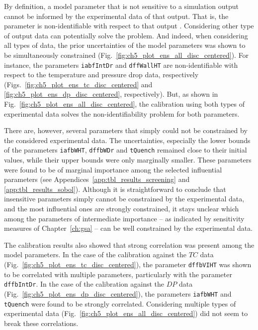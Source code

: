 By definition, a model parameter that is not sensitive to a simulation output cannot be informed by the experimental data of that output. 
That is, the parameter is non-identifiable with respect to that output \cite{Hines2014}.
Considering other type of output data can potentially solve the problem.
And indeed, when considering all types of data, the prior uncertainties of the model parameters was shown to be simultaneously constrained (Fig.~\ref{fig:ch5_plot_ens_all_disc_centered}).
For instance, the parameters \texttt{iabfIntDr} and \texttt{dffWallHT} are non-identifiable with respect to the temperature and pressure drop data, respectively (Figs.~\ref{fig:ch5_plot_ens_tc_disc_centered} and \ref{fig:ch5_plot_ens_dp_disc_centered}, respectively).
But, as shown in Fig.~\ref{fig:ch5_plot_ens_all_disc_centered}, the calibration using both types of experimental data solves the non-identifiability problem for both parameters.

There are, however, several parameters that simply could not be constrained by the considered experimental data.
The uncertainties, especially the lower bounds of the parameters \texttt{iafbWHT}, \texttt{dffbWDr} and \texttt{tQuench} remained close to their initial values,
while their upper bounds were only marginally smaller.
These parameters were found to be of marginal importance among the selected influential parameters (see Appendices~\ref{app:tbl_results_screening} and \ref{app:tbl_results_sobol}).
Although it is straightforward to conclude that insensitive parameters simply cannot be constrained by the experimental data, and the most influential ones are strongly constrained, it stays unclear which among the parameters of intermediate importance -- as indicated by sensitivity measures of Chapter~\ref{ch:gsa} -- can be well constrained by the experimental data.

The calibration results also showed that strong correlation was pres\-ent among the model parameters.
In the case of the calibration against the $TC$ data (Fig.~\ref{fig:ch5_plot_ens_tc_disc_centered}), the parameter \texttt{dffbVIHT} was shown to be correlated with multiple parameters, particularly with the parameter \texttt{dffbIntDr}.
In the case of the calibration against the $DP$ data (Fig.~\ref{fig:ch5_plot_ens_dp_disc_centered}), the parameters \texttt{iafbWHT} and \texttt{tQuench} were found to be strongly correlated. 
Considering multiple types of experimental data (Fig.~\ref{fig:ch5_plot_ens_all_disc_centered}) did not seem to break these correlations.

